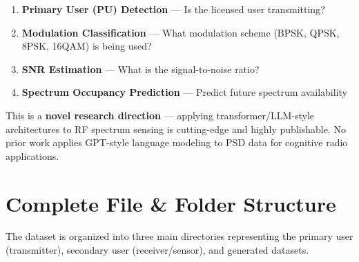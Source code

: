 \documentclass[12pt, a4paper]{article}
\begin{document}
\begin{keybox}
\begin{enumerate}[label=\arabic*., leftmargin=1.5em]
    \item \textbf{Primary User (PU) Detection} — Is the licensed user transmitting?
    \item \textbf{Modulation Classification} — What modulation scheme (BPSK, QPSK, 8PSK, 16QAM) is being used?
    \item \textbf{SNR Estimation} — What is the signal-to-noise ratio?
    \item \textbf{Spectrum Occupancy Prediction} — Predict future spectrum availability
\end{enumerate}
\end{keybox}

\begin{notebox}
This is a \textbf{novel research direction} — applying transformer/LLM-style architectures to RF spectrum sensing is cutting-edge and highly publishable. No prior work applies GPT-style language modeling to PSD data for cognitive radio applications.
\end{notebox}


\section{Complete File \& Folder Structure}

The dataset is organized into three main directories representing the primary user (transmitter), secondary user (receiver/sensor), and generated datasets.
\end{document}

